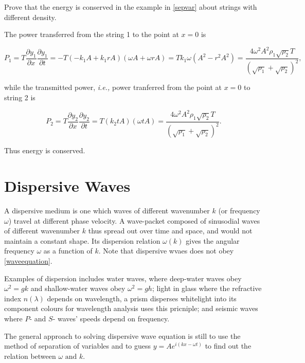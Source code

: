 \documentclass[a4paper,12pt]{report}
\begin{document}
{Prove that the energy is conserved in the example in \cref{sepvar} about strings with different density.}
{The power transferred from the string 1 to the point at \(x = 0\) is

\begin{equation}
	P_1  = T \frac{\partial y_1 }{\partial x}\frac{\partial y_1 }{\partial t} = -T(-k_1 A + k_1 rA)(\omega A+\omega rA) = Tk_1 \omega (A^2-r^2A^2) = \frac{4 \omega ^2A^2 \rho _{1} \sqrt{\rho _{2} }T }{(\sqrt{\rho _{1}}+\sqrt{\rho _{2} }  )^2}, 
\end{equation}

while the transmitted power, \textit{i.e.,} power tranferred from the point at \(x=0\) to string 2 is

\begin{equation}
	P_2  = T \frac{\partial y_2 }{\partial x}\frac{\partial y_2 }{\partial t} = T(k_2 tA)(\omega tA) =   \frac{4 \omega ^2A^2 \rho _{1} \sqrt{\rho _{2} }T }{(\sqrt{\rho _{1}}+\sqrt{\rho _{2} }  )^2}.
\end{equation}

Thus energy is conserved.

} 

\section{Dispersive Waves}

A dispersive medium is one which waves of different wavenumber \(k\) (or frequency \(\omega \)) travel at different phase velocity. A wave-packet composed of sinusodial waves of different wavenumber \(k\) thus spread out over time and space, and would not maintain a constant shape. Its dispersion relation \(\omega (k)\) gives the angular frequency \(\omega \) as a function of \(k\). Note that dispersive wvaes does not obey \cref{waveequation}.

Examples of dispersion includes water waves, where deep-water waves obey \(\omega ^2 = gk\) and shallow-water waves obey \(\omega ^2 = gh\); light in glass where the refractive index \(n(\lambda )\) depends on wavelength, a prism disperses whitelight into its component colours for wavelength analysis uses this pricniple; and seismic waves where \(P\)- and \(S\)- waves' speeds depend on frequency.    

The general approach to solving dispersive wave equation is still to use the method of separation of variables and to guess \(y = A e^{i (kx-\omega t)} \) to find out the relation between \(\omega \text { and } k\).   
\end{document}
